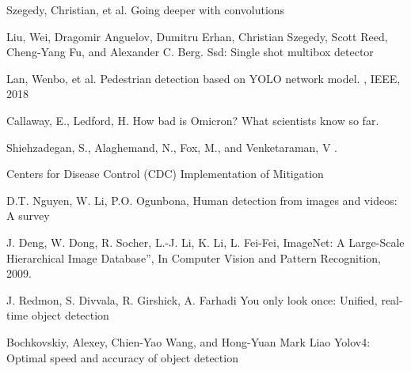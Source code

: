 \documentclass{svproc}
\begin{document}
\begin{thebibliography}{6}
Szegedy, Christian, et al. 
\newblock Going deeper with convolutions

Liu, Wei, Dragomir Anguelov, Dumitru Erhan, Christian Szegedy, Scott Reed, Cheng-Yang Fu, and Alexander C. Berg. 
\newblock Ssd: Single shot multibox detector 

Lan, Wenbo, et al.
\newblock Pedestrian detection based on YOLO network model.
,
IEEE, 2018

Callaway, E., Ledford, H. 
\newblock How bad is Omicron? What scientists know so far. 

\newblock Shiehzadegan, S., Alaghemand, N., Fox, M., and Venketaraman, V 
.

Centers for Disease Control (CDC)
\newblock Implementation of Mitigation

D.T. Nguyen, W. Li, P.O. Ogunbona,
\newblock Human detection from images and videos: A survey 

J. Deng, W. Dong, R. Socher, L.-J. Li, K. Li, L. Fei-Fei, 
\newblock ImageNet: A Large-Scale Hierarchical Image Database”, In Computer Vision and Pattern Recognition, 2009.

J. Redmon, S. Divvala, R. Girshick, A. Farhadi
\newblock You only look once: Unified, real-time object detection

Bochkovskiy, Alexey, Chien-Yao Wang, and Hong-Yuan Mark Liao
\newblock Yolov4: Optimal speed and accuracy of object detection

\end{thebibliography}
\end{document}

